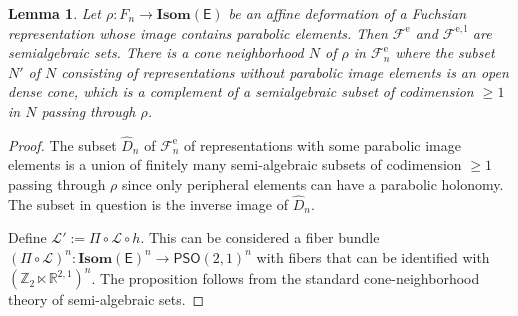 \documentclass[10pt,a4paper]{amsart}
\newtheorem{lemma}{Lemma}
\newcommand\Hom{{\rm Hom}}
\newcommand\Isom{{\mathbf{Isom}}}
\newcommand\Lspace{\mathsf E}
\newcommand\PO{{\mathsf{PSO}}}
\newcommand\SO{{\mathsf{SO}}}
\newcommand\bR{{\mathbb{R}}}
\newcommand\bZ{{\mathbb Z}}
\newcommand\ra{\rightarrow}
\newcommand{\rome}{\mathrm e}
\newcommand{\romel}{{\mathrm{e}, \mathrm{l}}}
\begin{document}
\begin{lemma} \label{lem:deformnop} 
Let $\rho:F_n \ra \Isom(\Lspace)$ be an affine deformation of a Fuchsian representation whose image contains parabolic elements.
Then $\mathcal{F}^{\rome}$ and $\mathcal{F}^{\romel}$ are semialgebraic sets. 
There is a cone neighborhood $N$ of $\rho$ in $\mathcal{F}^{\rome}_n$ where 
the subset $N'$ of $N$ consisting of representations without parabolic image elements is 
an open dense cone, which is a complement of a semialgebraic subset of codimension 
$\geq 1$ in $N$ passing through $\rho$. 
\end{lemma}

\begin{proof} 
The subset $\hat D_n$ of $\mathcal{F}^{\rome}_n$ of representations 
with some parabolic image elements is a union of finitely many semi-algebraic subsets of codimension $\geq 1$ passing through $\rho$
since only peripheral elements can have a parabolic holonomy. 
The subset in question is the inverse image of $\hat D_n$. 

Define $\mathcal{L'} := \Pi\circ \mathcal{L}\circ h$.
This can be considered a fiber bundle
$(\Pi\circ\mathcal{L})^n:\Isom(\Lspace)^n \ra \PO(2, 1)^n$
with fibers that can be identified with $(\bZ_2\ltimes \bR^{2, 1})^n$. 
The proposition follows from the standard 
cone-neighborhood theory of semi-algebraic sets. 
%
\end{proof} 
\end{document}
